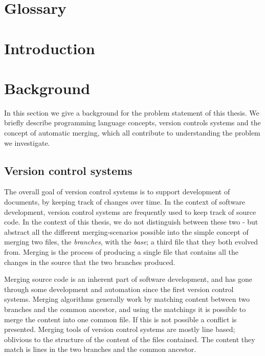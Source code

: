 \documentclass[11pt]{article}
\author{Kasper Videbæk}
\date{\today}
\begin{document}
\maketitle

\clearpage
\setcounter{tocdepth}{2}
\tableofcontents

\clearpage 

\section*{Glossary}

\clearpage 
\section{Introduction}


\clearpage 
\section{Background}
In this section we give a background for the problem statement of this thesis. We briefly describe programming language concepts, version controls systems and the concept of automatic merging, which all contribute to understanding the problem we investigate.

\subsection{Version control systems}
The overall goal of version control systems is to support development of documents, by keeping track of changes over time. In the context of software development, version control systems are frequently used to keep track of source code. In the context of this thesis, we do not distinguish between these two - but abstract all the different merging-scenarios possible into the simple concept of merging two files, the \textit{branches}, with the \textit{base}; a third file that they both evolved from. Merging is the process of producing a single file that contains all the changes in the source that the two branches produced.

Merging source code is an inherent part of software development, and has gone through some development and automation since the first version control systems. Merging algorithms generally work by matching content between two branches and the common ancestor, and using the matchings it is possible to merge the content into one common file. If this is not possible a conflict is presented. Merging tools of version control systems are mostly line based; oblivious to the structure of the content of the files contained. The content they match is lines in the two branches and the common ancestor. 
\end{document}
